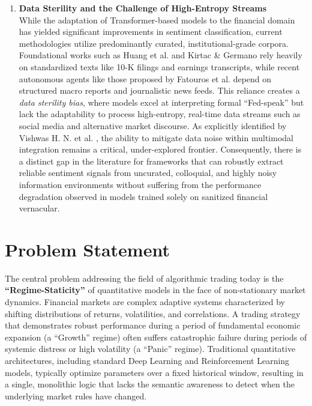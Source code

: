 \documentclass[12pt, a4paper]{report}
\begin{document}
\begin{enumerate}
    \item \textbf{Data Sterility and the Challenge of High-Entropy Streams} \\
    While the adaptation of Transformer-based models to the financial domain has yielded significant improvements in sentiment classification, current methodologies utilize predominantly curated, institutional-grade corpora. Foundational works such as Huang et al. \cite{huang2023} and Kirtac \& Germano \cite{kirtac2024} rely heavily on standardized texts like 10-K filings and earnings transcripts, while recent autonomous agents like those proposed by Fatouros et al. \cite{fatouros2025} depend on structured macro reports and journalistic news feeds. This reliance creates a \textit{data sterility bias}, where models excel at interpreting formal ``Fed-speak'' but lack the adaptability to process high-entropy, real-time data streams such as social media and alternative market discourse. As explicitly identified by Vishwas H. N. et al. \cite{vishwas2025}, the ability to mitigate data noise within multimodal integration remains a critical, under-explored frontier. Consequently, there is a distinct gap in the literature for frameworks that can robustly extract reliable sentiment signals from uncurated, colloquial, and highly noisy information environments without suffering from the performance degradation observed in models trained solely on sanitized financial vernacular.
\end{enumerate}


\newpage
\chapter{Problem Statement}


The central problem addressing the field of algorithmic trading today is the \textbf{``Regime-Staticity''} of quantitative models in the face of non-stationary market dynamics. Financial markets are complex adaptive systems characterized by shifting distributions of returns, volatilities, and correlations. A trading strategy that demonstrates robust performance during a period of fundamental economic expansion (a ``Growth'' regime) often suffers catastrophic failure during periods of systemic distress or high volatility (a ``Panic'' regime). Traditional quantitative architectures, including standard Deep Learning and Reinforcement Learning models, typically optimize parameters over a fixed historical window, resulting in a single, monolithic logic that lacks the semantic awareness to detect when the underlying market rules have changed.
\end{document}
